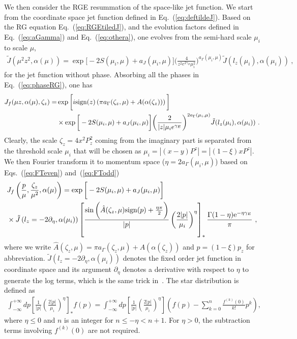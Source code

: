 \documentclass[a4paper,11pt]{article}
\begin{document}
We then consider the RGE resummation of the space-like jet function. We start from the coordinate space jet function defined in Eq.~(\ref{eq:deftildeJ}). Based on the RG equation Eq.~(\ref{eq:RGEtiledJ}), and the evolution factors defined in Eq.~(\ref{eq:aGamma}) and Eq.~(\ref{eq:othera}), one evolves from the semi-hard scale $\mu_i$ to scale $\mu$,
\begin{align}
\tilde J\left(\mu^2z^2,\alpha(\mu)\right)=\exp\bigg[-2S(\mu_i,\mu)+a_{J}(\mu_i,\mu)\bigg]\bigg(\frac{4}{z^2e^{2\gamma_E}\mu_i^2}\bigg)^{a_{\Gamma}(\mu_i,\mu)}\tilde J(l_z(\mu_i),\alpha(\mu_i)) \ ,
\end{align}
for the jet function without phase. Absorbing all the phases in Eq.~(\ref{eq:phaseRG}), one has
\begin{align}\label{eq:JetRGCoor}
J_{f}(\mu z,\alpha(\mu),\zeta_z)=&\exp\bigg[i{\rm sign}(z)\left(\pi a_{\Gamma}(\zeta_z,\mu)+A(\alpha(\zeta_z))\right)
\bigg]\nonumber \\ 
&\times \exp\bigg[-2S(\mu_i,\mu)+a_{J}(\mu_i,\mu)\bigg]\bigg(\frac{2}{|z|\mu_ie^{\gamma_E}}\bigg)^{2a_{\Gamma}(\mu_i,\mu)}\tilde J(l_z(\mu_i),\alpha(\mu_i)) \ .
\end{align}
Clearly, the scale $\zeta_z=4x^2P_z^2$ coming from the imaginary part is separated from the threshold scale $\mu_i$ that will be chosen as $\mu_i=|(x-y)P^z|=|(1-\xi)xP^z|$. 
We then Fourier transform it to momentum space ($\eta=2a_{\Gamma}(\mu_i,\mu)$) based on Eqs.~(\ref{eq:FTeven}) and~(\ref{eq:FTodd})
\begin{align}
&J_f\left(\frac{p}{\mu},\frac{\zeta_z}{\mu^2},\alpha(\mu)\right)=\exp\bigg[-2S(\mu_i,\mu)+a_{J}(\mu_i,\mu)\bigg]  \nonumber \\ &
\times \tilde J\left(l_z=-2\partial_{\eta},\alpha(\mu_i)\right)\left[\frac{\sin \bigg(\hat A(\zeta_z,\mu){\rm sign}(p)+\frac{\eta \pi}{2}\bigg)}{|p|}\left(\frac{2|p|}{\mu_i}\right)^\eta\right]_{*}\frac{ \Gamma(1-\eta) \mathrm{e}^{-\eta \gamma_E}}{\pi} \ ,
\end{align}
where we write $\hat A(\zeta_z,\mu)=\pi a_{\Gamma}(\zeta_z,\mu)+A(\alpha(\zeta_z))$ and $p=(1-\xi) p_z$ for abbreviation. 
$\tilde J\left(l_z=-2\partial_{\eta},\alpha(\mu_i)\right)$ denotes the fixed order jet function in coordinate space and its argument $\partial_\eta$ denotes a derivative with respect to $\eta$ to generate the log terms, which is the same trick in~\cite{Becher:2006mr}. The star distribution is defined as
\begin{align}\label{eq:star}
\int_{-\infty}^{+\infty} dp \left[\frac{1}{|p|}\left(\frac{2|p|}{\mu_i}\right)^\eta\right]_{*}f(p) = \int_{-\infty}^{+\infty} dp \left[\frac{1}{|p|}\left(\frac{2|p|}{\mu_i}\right)^\eta\right]\left(f(p)-\sum_{k=0}^{n}\frac{f^{(k)}(0)}{k!}p^k\right),
\end{align}
where $\eta\leq0$ and $n$ is an integer for $n\leq-\eta<n+1$. For $\eta>0$, the subtraction terms involving $f^{(k)}(0)$ are not required.
\end{document}
